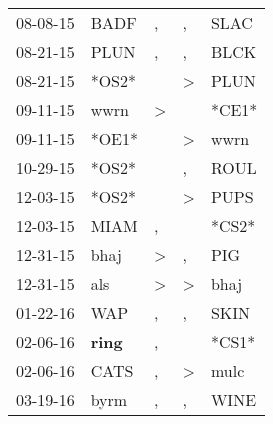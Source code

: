 \begin{supertabular}{p{0.07\textwidth}p{0.06\textwidth}p{0.02\textwidth}p{0.02\textwidth}p{0.06\textwidth}}
          08-08-15\textsuperscript{} &           BADF\textsuperscript{} &                , &                , &           SLAC\textsuperscript{} \\
          08-21-15\textsuperscript{} &           PLUN\textsuperscript{} &                , &                , &           BLCK\textsuperscript{} \\
          08-21-15\textsuperscript{} &                            *OS2* &                  &     \textgreater &           PLUN\textsuperscript{} \\
          09-11-15\textsuperscript{} &           wwrn\textsuperscript{} &     \textgreater &                  &                            *CE1* \\
          09-11-15\textsuperscript{} &                            *OE1* &                  &     \textgreater &           wwrn\textsuperscript{} \\
          10-29-15\textsuperscript{} &                            *OS2* &                  &                , &           ROUL\textsuperscript{} \\
          12-03-15\textsuperscript{} &                            *OS2* &                  &     \textgreater &           PUPS\textsuperscript{} \\
          12-03-15\textsuperscript{} &           MIAM\textsuperscript{} &                , &                  &                            *CS2* \\
          12-31-15\textsuperscript{} &           bhaj\textsuperscript{} &     \textgreater &                , &            PIG\textsuperscript{} \\
          12-31-15\textsuperscript{} &            als\textsuperscript{} &     \textgreater &     \textgreater &           bhaj\textsuperscript{} \\
          01-22-16\textsuperscript{} &            WAP\textsuperscript{} &                , &                , &           SKIN\textsuperscript{} \\
          02-06-16\textsuperscript{} &  \textbf{ring\textsuperscript{}} &                , &                  &                            *CS1* \\
          02-06-16\textsuperscript{} &           CATS\textsuperscript{} &                , &     \textgreater &           mulc\textsuperscript{} \\
          03-19-16\textsuperscript{} &           byrm\textsuperscript{} &                , &                , &           WINE\textsuperscript{} \\

\end{supertabular}
